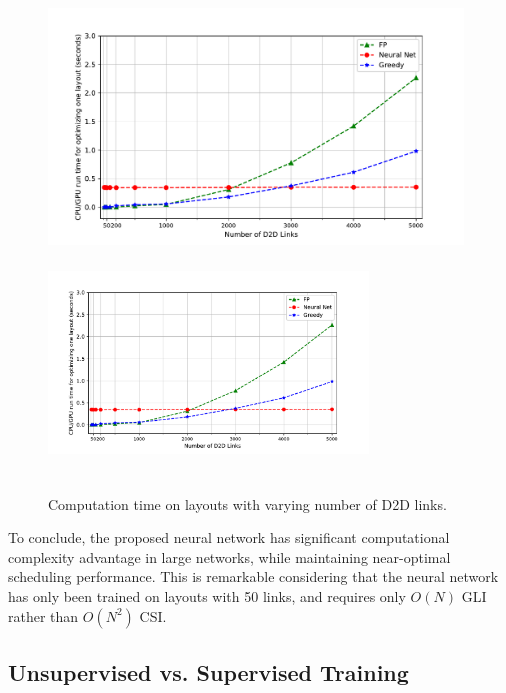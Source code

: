\documentclass[journal,12pt,onecolumn,draftclsnofoot,]{IEEEtran}
\begin{document}
\begin{figure}
        \ifOneColumn
            \includegraphics[width=11cm]{fig/VaryDensityTime}
        \else
            \includegraphics[width=8.5cm,height=6cm]{fig/VaryDensityTime}
        \fi
        \caption{Computation time on layouts with varying number of D2D links.}
        \label{fig:varyDensityTime}
\end{figure}

To conclude, the proposed neural network has significant computational
complexity advantage in large networks, while maintaining near-optimal
scheduling performance. This is remarkable considering that the neural network
has only been trained on layouts with 50 links, and requires only $O(N)$ GLI
rather than $O(N^2)$ CSI.

\subsection{Unsupervised vs. Supervised Training} \label{sec:unsupervisedVSsupervised}
\end{document}
